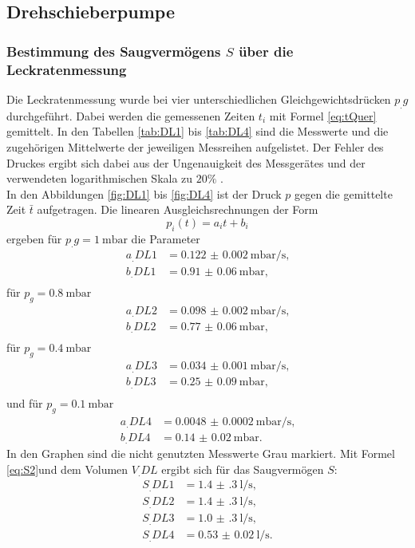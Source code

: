 \subsection{Drehschieberpumpe}

\subsubsection{Bestimmung des Saugvermögens $S$ über die Leckratenmessung}

Die Leckratenmessung wurde bei vier unterschiedlichen Gleichgewichtsdrücken $p_.g$ durchgeführt. Dabei werden die gemessenen Zeiten $t_i$ mit Formel \eqref{eq:tQuer} gemittelt.
In den Tabellen \ref{tab:DL1} bis \ref{tab:DL4} sind die Messwerte und die zugehörigen Mittelwerte der jeweiligen Messreihen aufgelistet. Der Fehler des Druckes ergibt sich dabei aus der Ungenauigkeit des Messgerätes und der verwendeten logarithmischen Skala zu $20\%$ \cite{V70}.\\
In den Abbildungen \ref{fig:DL1} bis \ref{fig:DL4} ist der Druck $p$ gegen die gemittelte Zeit $\bar{t}$ aufgetragen.
Die linearen Ausgleichsrechnungen der Form
\[
p_i(t) = a_it+b_i
\]
ergeben für $p_.g = \SI{1}{\milli\bar}$ die Parameter
\begin{align*}
a_.{DL1} &= \SI{0.122(2)}{\milli\bar\per\second} \text{,}\\
b_.{DL1} &= \SI{0.91(6)}{\milli\bar} \text{,}\\
\end{align*}
für $p_g = \SI{0.8}{\milli\bar}$
\begin{align*}
a_.{DL2} &= \SI{0.098(2)}{\milli\bar\per\second} \text{,}\\
b_.{DL2} &= \SI{0.77(6)}{\milli\bar} \text{,}\\
\end{align*}
für $p_g = \SI{0.4}{\milli\bar}$
\begin{align*}
a_.{DL3} &= \SI{0.034(1)}{\milli\bar\per\second} \text{,}\\
b_.{DL3} &= \SI{0.25(9)}{\milli\bar} \text{,}\\
\end{align*}
und für $p_g = \SI{0.1}{\milli\bar}$
\begin{align*}
a_.{DL4} &= \SI{0.0048(2)}{\milli\bar\per\second} \text{,}\\
b_.{DL4} &= \SI{0.14(2)}{\milli\bar} \text{.}
\end{align*}
In den Graphen sind die nicht genutzten Messwerte Grau markiert.
Mit Formel \eqref{eq:S2}und dem Volumen $V_.{DL}$ ergibt sich für das Saugvermögen $S$:
\begin{align*}
S_.{DL1} &= \SI{1.4(3)}{\litre\per\second} \text{,}\\
S_.{DL2} &= \SI{1.4(3)}{\litre\per\second} \text{,}\\
S_.{DL3} &= \SI{1.0(3)}{\litre\per\second} \text{,}\\
S_.{DL4}   &= \SI{0.53(2)}{\litre\per\second} \text{.}
\end{align*}

